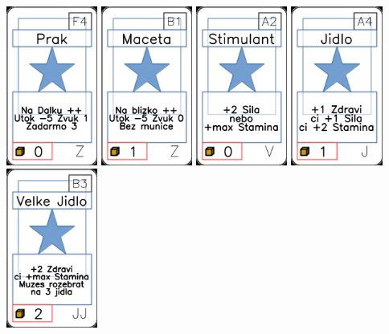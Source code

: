 \documentclass[a4paper]{article}
\begin{document}
	\includegraphics[width=3.0cm]{img-1_88}
	\includegraphics[width=3.0cm]{img-1_95}
	\includegraphics[width=3.0cm]{img-1_61}
	\includegraphics[width=3.0cm]{img-1_3}
	\includegraphics[width=3.0cm]{img-1_37}
\end{document}
